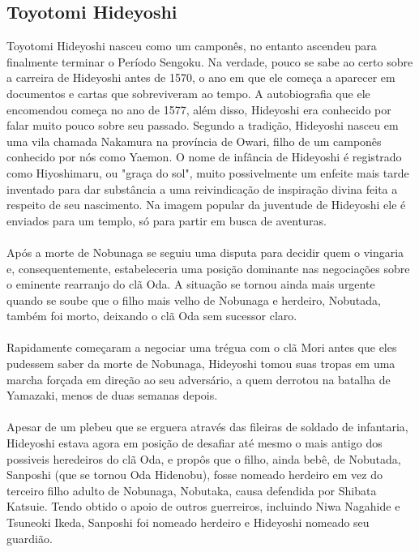 \documentclass[12pt, a4paper]{article}
\begin{document}
        \subsection {Toyotomi Hideyoshi}
             Toyotomi Hideyoshi nasceu como um camponês, no entanto ascendeu para finalmente terminar o Período Sengoku. Na verdade, pouco se sabe ao certo sobre a carreira de Hideyoshi antes de 1570, o ano em que ele começa a aparecer em documentos e cartas que sobreviveram ao tempo. A autobiografia que ele encomendou começa no ano de 1577, além disso, Hideyoshi era conhecido por falar muito pouco sobre seu passado. Segundo a tradição, Hideyoshi nasceu em uma vila chamada Nakamura na província de Owari, filho de um camponês conhecido por nós como Yaemon. O nome de infância de Hideyoshi é registrado como Hiyoshimaru, ou "graça do sol", muito possivelmente um enfeite mais tarde inventado para dar substância a uma reivindicação de inspiração divina feita a respeito de seu nascimento. Na imagem popular da juventude de Hideyoshi ele é enviados para um templo, só para partir em busca de aventuras.\\
            \\
            \indent Após a morte de Nobunaga se seguiu uma disputa para decidir quem o vingaria e, consequentemente, estabeleceria uma posição dominante nas negociações sobre o eminente rearranjo do clã Oda. A situação se tornou ainda mais urgente quando se soube que o filho mais velho de Nobunaga e herdeiro, Nobutada, também foi morto, deixando o clã Oda sem sucessor claro.\\
            \\
            \indent Rapidamente começaram a negociar uma trégua com o clã Mori antes que eles pudessem saber da morte de Nobunaga, Hideyoshi tomou suas tropas em uma marcha forçada em direção ao seu adversário, a quem derrotou na batalha de Yamazaki, menos de duas semanas depois.\\
            \\
            \indent Apesar de um plebeu que se erguera através das fileiras de soldado de infantaria, Hideyoshi estava agora em posição de desafiar até mesmo o mais antigo dos possiveis heredeiros do clã Oda, e propôs que o filho, ainda bebê, de Nobutada, Sanposhi (que se tornou Oda Hidenobu), fosse nomeado herdeiro em vez do terceiro filho adulto de Nobunaga, Nobutaka, causa defendida por Shibata Katsuie. Tendo obtido o apoio de outros guerreiros, incluindo Niwa Nagahide e Tsuneoki Ikeda, Sanposhi foi nomeado herdeiro e Hideyoshi nomeado seu guardião.\\
\end{document}
